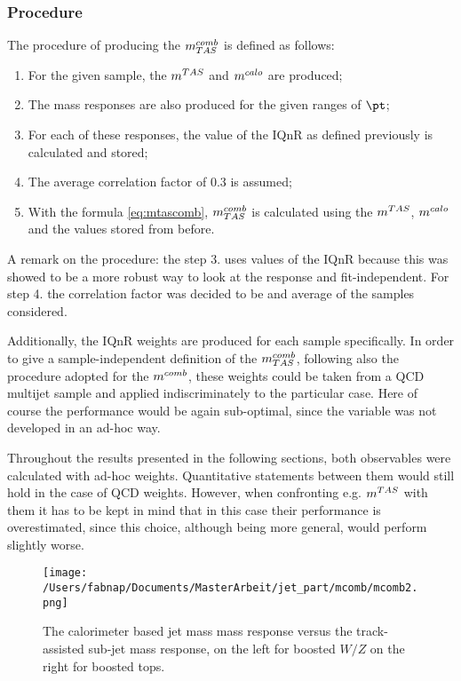 \subsubsection{Procedure}
The procedure of producing the $m^{comb}_{TAS}$ is defined as follows:
\begin{enumerate}
 \item For the given sample, the $\mtas$ and $\mcal$ are produced;
 \item The mass responses are also produced for the given ranges of $\pt$;
 \item For each of these responses, the value of the IQnR as defined previously is calculated and stored;
 \item The average correlation factor of 0.3 is assumed;
 \item With the formula \ref{eq:mtascomb}, $m^{comb}_{TAS}$ is calculated using the $\mtas$, $\mcal$ and the values stored from before.
\end{enumerate}
A remark on the procedure: the step 3. uses values of the IQnR because this was showed to be a more robust way to look at the response and fit-independent. For step 4. the correlation factor was decided to be and average of the samples considered.

Additionally, the IQnR weights are produced for each sample specifically. In order to give a sample-independent definition of the $m^{comb}_{TAS}$, following also the procedure adopted for the $m^{comb}$, these weights could be taken from a QCD multijet sample and applied indiscriminately to the particular case. Here of course the performance would be again sub-optimal, since the variable was not developed in an ad-hoc way.

Throughout the results presented in the following sections, both observables were calculated with ad-hoc weights. Quantitative statements between them would still hold in the case of QCD weights. However, when confronting e.g. $\mtas$ with them it has to be kept in mind that in this case their performance is overestimated, since this choice, although being more general, would perform slightly worse.

\begin{figure}[!ht]
  \centering
      \texttt{[image: /Users/fabnap/Documents/MasterArbeit/jet\_part/mcomb/mcomb2.png]}
  \caption[$\mcal$ and $\mtas$ correlation plots]{The calorimeter based jet mass mass response versus the track-assisted sub-jet mass response, on the left for boosted $W/Z$ on the right for boosted tops.}
  \label{fig:mcomb2}
\end{figure}

